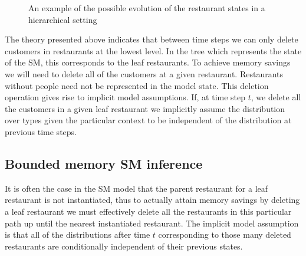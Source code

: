 \begin{figure}[t] 
	\begin{center}
		\caption{An example of the possible evolution of the restaurant states in a hierarchical setting}
		\label{figResultsCC}
	\end{center} 
\end{figure} 

The theory presented above indicates that between time steps we can only delete customers in restaurants at the lowest level.  In the tree which represents the state of the SM, this corresponds to the leaf restaurants.  To achieve memory savings we will need to delete all of the customers at a given restaurant.  Restaurants without people need not be represented in the model state.  This deletion operation gives rise to implicit model assumptions. If, at time step $t$, we delete all the customers in a given leaf restaurant we implicitly assume the distribution over types given the particular context to be independent of the distribution at previous time steps.

\subsection{Bounded memory SM inference}

It is often the case in the SM model that the parent restaurant for a leaf restaurant is not instantiated, thus to actually attain memory savings by deleting a leaf restaurant we must effectively delete all the restaurants in this particular path up until the nearest instantiated restaurant.  The implicit model assumption is that all of the distributions after time $t$ corresponding to those many deleted restaurants are conditionally independent of their previous states.

